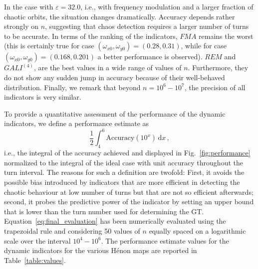 In the case with $\varepsilon=32.0$, i.e., with frequency modulation and a larger fraction of chaotic orbits, the situation changes dramatically. Accuracy depends rather strongly on $n$, suggesting that chaos detection requires a larger number of turns to be accurate. In terms of the ranking of the indicators, $FMA$ remains the worst (this is certainly true for case $(\omega_{x0}, \omega_{y0})=(0.28, 0.31)$, while for case $(\omega_{x0}, \omega_{y0})=(0.168, 0.201)$ a better performance is observed). $REM$ and $GALI^{(4)}$, are the best values in a wide range of values of $n$. Furthermore, they do not show any sudden jump in accuracy because of their well-behaved distribution. Finally, we remark that beyond $n = 10^6 - 10^7$, the precision of all indicators is very similar.

To provide a quantitative assessment of the performance of the dynamic indicators, we define a performance estimate as
\begin{equation}
    \frac{1}{2}\int_4^6 \text{Accuracy}(10^x) \,\mathrm{d}x \,,
    \label{eq:final_evaluation}
\end{equation}
i.e., the integral of the accuracy achieved and displayed in Fig.~\ref{fig:performance} normalized to the integral of the ideal case with unit accuracy throughout the turn interval. The reasons for such a definition are twofold: First, it avoids the possible bias introduced by indicators that are more efficient in detecting the chaotic behaviour at low number of turns but that are not so efficient afterwards; second, it probes the predictive power of the indicator by setting an upper bound that is lower than the turn number used for determining the GT. Equation~\eqref{eq:final_evaluation} has been numerically evaluated using the trapezoidal rule and considering 50 values of $n$ equally spaced on a logarithmic scale over the interval $10^4-10^6$.  The performance estimate values for the dynamic indicators for the various H\'enon maps are reported in Table~\ref{table:values}. 

